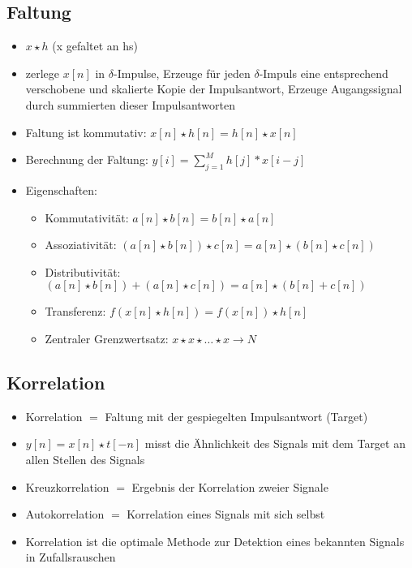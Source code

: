 \documentclass{article} %
\begin{document}
	\subsection{Faltung}
	\begin{itemize}
		\item $x \star h$ (x gefaltet an hs)
		\item zerlege $x[n]$ in $\delta$-Impulse, Erzeuge für jeden $\delta$-Impuls eine entsprechend verschobene und skalierte Kopie der Impulsantwort, Erzeuge Augangssignal durch summierten dieser Impulsantworten
		\item Faltung ist kommutativ: $x[n] \star h[n] = h[n] \star x[n]$
		\item Berechnung der Faltung: $y[i] = \sum_{j=1}^{M}h[j]*x[i-j]$
		\item Eigenschaften:
		\begin{itemize}
			\item Kommutativität: $a[n] \star b[n] = b[n]\star a[n]$
			\item Assoziativität: $(a[n]\star b[n]) \star c[n] = a[n] \star (b[n]\star c[n])$
			\item Distributivität: $(a[n]\star b[n]) + (a[n]\star c[n] ) = a[n]\star(b[n]+c[n])$ 
			\item Transferenz: $f(x[n]\star h[n]) = f(x[n])\star h[n]$
			\item Zentraler Grenzwertsatz: $x \star x \star \dots \star x \rightarrow N$
		\end{itemize}
	\end{itemize}
	\subsection{Korrelation}
	\begin{itemize}
		\item Korrelation $=$ Faltung mit der gespiegelten Impulsantwort (Target)
		\item $y[n] = x[n] \star t[-n]$ misst die Ähnlichkeit des Signals mit dem Target an allen Stellen des Signals
		\item Kreuzkorrelation $=$ Ergebnis der Korrelation zweier Signale
		\item Autokorrelation $=$ Korrelation eines Signals mit sich selbst
		\item Korrelation ist die optimale Methode zur Detektion eines bekannten Signals in Zufallsrauschen
	\end{itemize}
\end{document}
